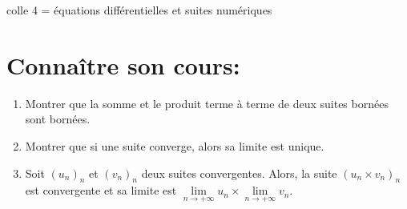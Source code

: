 \documentclass[a4paper,11pt]{article}
\theoremstyle{definition}
\begin{document}
	
	
	\begin{center}
		\Large \sc colle 4 = équations différentielles et suites numériques
	\end{center}

\section*{Connaître son cours:}
\begin{enumerate}
	\item Montrer que la somme et le produit terme à terme de deux suites bornées sont bornées.
	\item Montrer que si une suite converge, alors sa limite est unique.
	\item  Soit $(u_n )_n$ et $(v_n )_n$ deux suites convergentes. Alors, la suite $(u_n \times v_n )_n$ est convergente et sa limite est
	$\lim\limits_{n\rightarrow +\infty} u_n\times \lim\limits_{n\rightarrow +\infty}v_n$.
\end{enumerate}
\end{document}
